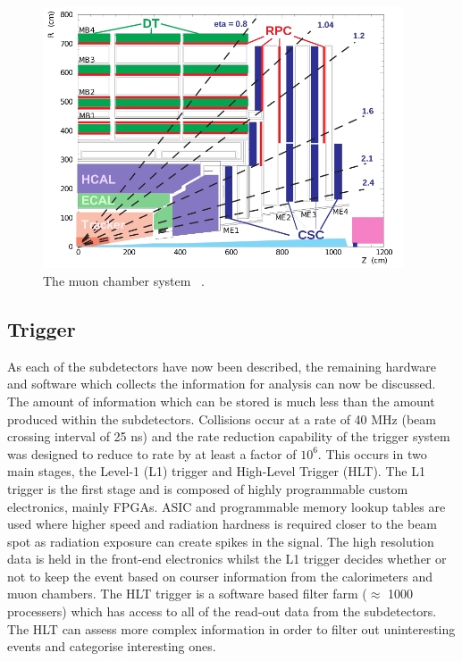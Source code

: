 \begin{figure}[ht!]
\centering
    \includegraphics[width=0.95\textwidth]{images/MuonChambers.png}
    \caption{The muon chamber system ~\cite{Kim:2012ix}.}
    \label{fig:muonchamber}
\end{figure}

\subsection{Trigger \label{det:trigger}}
As each of the subdetectors have now been described, the remaining hardware and software which collects the information for analysis can now be discussed. The amount of information which can be stored is much less than the amount produced within the subdetectors. Collisions occur at a rate of 40 MHz (beam crossing interval of 25 ns) and the rate reduction capability of the trigger system was designed to reduce to rate by at least a factor of $10^6$. This occurs in two main stages, the Level-1 (L1) trigger and High-Level Trigger (HLT). The L1 trigger is the first stage and is composed of highly programmable custom electronics, mainly FPGAs. ASIC and programmable memory lookup tables are used where higher speed and radiation hardness is required closer to the beam spot as radiation exposure can create spikes in the signal. The high resolution data is held in the front-end electronics whilst the L1 trigger decides whether or not to keep the event based on courser information from the calorimeters and muon chambers. The HLT trigger is a software based filter farm ($\approx$ 1000 processers) which has access to all of the read-out data from the subdetectors. The HLT can assess more complex information in order to filter out uninteresting events and categorise interesting ones.

